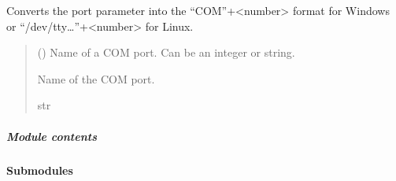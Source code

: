 \documentclass[letterpaper,10pt,english]{sphinxmanual}
\begin{document}
\begin{fulllineitems}
\begin{fulllineitems}
\begin{quote}
\begin{description}
\end{description}\end{quote}

\end{fulllineitems}


\begin{fulllineitems}
\label{\detokenize{Morelia.Devices.SerialPorts:Morelia.Devices.SerialPorts.SerialComm.PortIO.__BuildPortName}}
\pysigstartsignatures
{}
\pysigstopsignatures
\sphinxAtStartPar
Converts the port parameter into the “COM”+\textless{}number\textgreater{} format for Windows or         “/dev/tty…”+\textless{}number\textgreater{} for Linux.
\begin{quote}\begin{description}
\sphinxAtStartPar
{} (\sphinxstyleliteralemphasis{\sphinxupquote{ | }}) \textendash{} Name of a COM port. Can be an integer or string.

\sphinxAtStartPar
Name of the COM port.

\sphinxAtStartPar
str

\end{description}\end{quote}

\end{fulllineitems}


\end{fulllineitems}



\subparagraph{Module contents}
\label{\detokenize{Morelia.Devices.SerialPorts:module-Morelia.Devices.SerialPorts}}\label{\detokenize{Morelia.Devices.SerialPorts:module-contents}}

\paragraph{Submodules}
\label{\detokenize{Morelia.Devices:submodules}}
\end{document}
